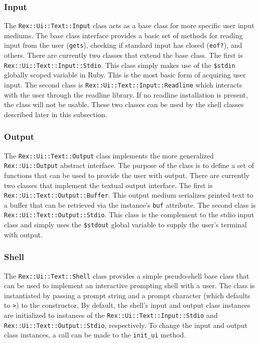 \documentclass{report}
\begin{document}
            \subsubsection{Input}

\par
The \texttt{Rex::Ui::Text::Input} class acts as a base class for
more specific user input mediums.  The base class interface provides
a basic set of methods for reading input from the user
(\texttt{gets}), checking if standard input has closed
(\texttt{eof?}), and others.  There are currently two classes that
extend the base class.  The first is
\texttt{Rex::Ui::Text::Input::Stdio}.  This class simply makes use
of the \texttt{\$stdin} globally scoped variable in Ruby.  This is
the most basic form of acquiring user input.  The second class is
\texttt{Rex::Ui::Text::Input::Readline} which interacts with the
user through the readline library.  If no readline installation is
present, the class will not be usable.  These two classes can be
used by the shell classes described later in this subsection.

            \subsubsection{Output}

The \texttt{Rex::Ui::Text::Output} class implements the more
generalized \texttt{Rex::Ui::Output} abstract interface.  The
purpose of the class is to define a set of functions that can be
used to provide the user with output.  There are currently two
classes that implement the textual output interface.  The first is
\texttt{Rex::Ui::Text::Output::Buffer}.  This output medium
serializes printed text to a buffer that can be retrieved via the
instance's \texttt{buf} attribute.  The second class is
\texttt{Rex::Ui::Text::Output::Stdio}.  This class is the complement
to the stdio input class and simply uses the \texttt{\$stdout}
global variable to supply the user's terminal with output.

            \subsubsection{Shell}

\par
The \texttt{Rex::Ui::Text::Shell} class provides a simple
pseudo-shell base class that can be used to implement an interactive
prompting shell with a user.  The class is instantiated by passing a
prompt string and a prompt character (which defaults to \verb#>#) to
the constructor.  By default, the shell's input and output class
instances are initialized to instances of the
\texttt{Rex::Ui::Text::Input::Stdio} and
\texttt{Rex::Ui::Text::Output::Stdio}, respectively.  To change the
input and output class instances, a call can be made to the
\texttt{init\_ui} method.
\end{document}
